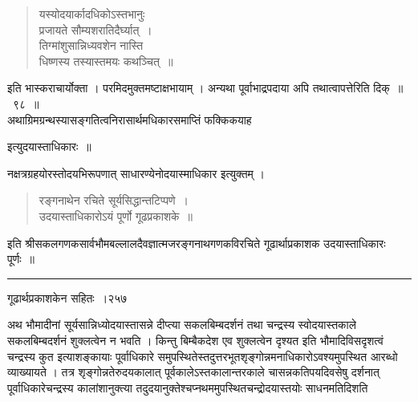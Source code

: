 \documentclass[11pt, openany]{book}
\begin{document}
 \begin{quote}
 {\qt यस्योदयार्कादधिकोऽस्तभानुः \\
प्रजायते सौम्यशरातिदैर्घ्यात्~।\\
तिग्मांशुसान्निध्यवशेन नास्ति \\
धिष्णस्य तस्यास्तमयः कथञ्चित्~॥\\ }
\end{quote}

 इति भास्कराचार्योक्ता । परमिदमुक्तमष्टाक्षभायाम् । अन्यथा पूर्वाभाद्रपदाया अपि तथात्वापत्तेरिति दिक्~॥~९८~॥ \\
\noindent अथाग्रिमग्रन्थस्यासङ्गतित्वनिरासार्थमधिकारसमाप्तिं फक्किकयाह \textendash

\begin{center}
 इत्युदयास्ताधिकारः~॥ 
\end{center}

 नक्षत्रग्रहयोरस्तोदयभिरूपणात् साधारण्येनोदयास्माधिकार इत्युक्तम् ।

\begin{quote}
{\qt रङ्गनाथेन रचिते सूर्यसिद्धान्तटिप्पणे~।\\
उदयास्ताधिकारोऽयं पूर्णो गूढप्रकाशके~॥}
\end{quote}
 इति श्रीसकलगणकसार्वभौमबल्लालदैवज्ञात्मजरङ्गनाथगणकविरचिते गूढार्थाप्रकाशक उदयास्ताधिकारः पूर्णः~॥



\begin{center}
\rule{8em}{.5pt}
\end{center}

\newpage


\hspace{3cm} गूढार्थप्रकाशकेन सहितः~।\hfill २५७
\vspace{1cm}


 अथ भौमादीनां सूर्यसान्निध्योदयास्तासन्ने दीप्त्या सकलबिम्बदर्शनं तथा चन्द्रस्य स्वोदयास्तकाले सकलबिम्बदर्शनं शुक्लत्वेन न भवति । किन्तु बिम्बैकदेश एव शुक्लत्वेन दृश्यत इति भौमादिविसदृशत्वं चन्द्रस्य कुत इत्याशङ्कायाः पूर्वाधिकारे समुपस्थितेस्तदुत्तरभूतशृङ्गोन्नमनाधिकारोऽवश्यमुपस्थित आरब्धो व्याख्यायते । तत्र शृङ्गोन्नतेरुदयकालात् पूर्वकालेऽस्तकालान्तरकाले चासन्नकतिपयदिवसेषु दर्शनात् पूर्वाधिकारेचन्द्रस्य कालांशानुक्त्या तदुदयानुक्तेश्चप्नथममुपस्थितचन्द्रोदयास्तयोः साधनमतिदिशति\textendash 
\end{document}
